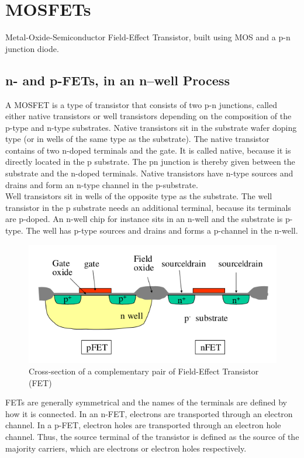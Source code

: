 \documentclass[main]{subfiles}
\begin{document}

\section{MOSFETs}
Metal-Oxide-Semiconductor Field-Effect Transistor, built using MOS and a p-n junction diode.
\subsection{n- and p-FETs, in an n–well Process}

A MOSFET is a type of transistor that consists of  two p-n junctions, called either native transistors or well transistors depending on the composition of the p-type and n-type substrates. Native transistors sit in the substrate wafer doping type (or in wells of the same type as the substrate). The native transistor contains of two n-doped terminals and the gate. It is called native, because it is directly located in the p substrate. The pn junction is thereby given between the substrate and the n-doped terminals. Native transistors have n-type sources and drains and form an n-type channel in the p-substrate. \\ Well transistors sit in wells of the opposite type as the substrate. The well transistor in the p substrate needs an additional terminal, because its terminals are p-doped. An n-well chip for instance sits in an n-well and the substrate is p-type.  The well has p-type sources and drains and forms a p-channel in the n-well.
\begin{figure}[H]
\centering
\includegraphics[width=0.6\linewidth]{figs/Field-effect-transistors.png}
\caption{Cross-section of a complementary pair of Field-Effect Transistor (FET)}
\label{field-effect transistor}
\end{figure}

FETs are generally symmetrical and the names of the terminals are defined by how it is connected. In an n-FET, electrons are transported through an electron channel. In a p-FET, electron holes are transported through an electron hole channel. Thus, the source terminal of the transistor is defined as the source of the majority carriers, which are electrons or electron holes respectively.\\
\end{document}
